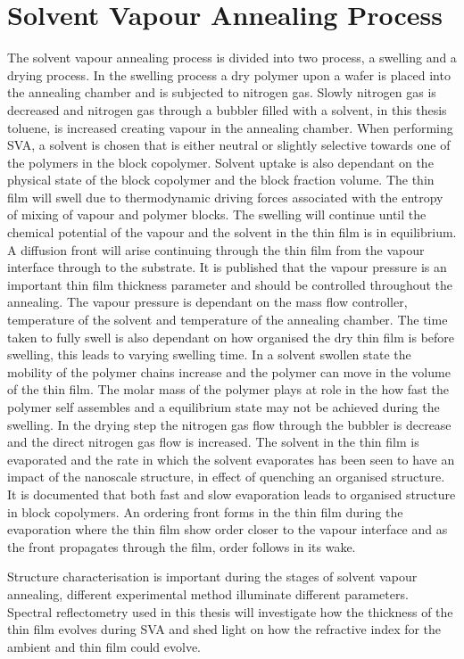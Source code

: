 \documentclass[MasterThesisMain.tex]{subfiles}
\begin{document}
\section{Solvent Vapour Annealing Process}
The solvent vapour annealing process is divided into two process, a swelling and a drying process. In the swelling process a dry polymer upon a wafer is placed into the annealing chamber and is subjected to nitrogen gas. Slowly nitrogen gas is decreased and nitrogen gas through a bubbler filled with a solvent, in this thesis toluene, is increased creating vapour in the annealing chamber. When performing SVA, a solvent is chosen that is either neutral or slightly selective towards one of the polymers in the block copolymer. Solvent uptake is also dependant on the physical state of the block copolymer and the block fraction volume. The thin film will swell due to thermodynamic driving forces associated with the entropy of mixing of vapour and polymer blocks. The swelling will continue until the chemical potential of the vapour and the solvent in the thin film is in equilibrium. A diffusion front will arise continuing through the thin film from the vapour interface through to the substrate. It is published that the vapour pressure is an important thin film thickness parameter and should be controlled throughout the annealing. The vapour pressure is dependant on the mass flow controller, temperature of the solvent and temperature of the annealing chamber. The time taken to fully swell is also dependant on how organised the dry thin film is before swelling, this leads to varying swelling time. In a solvent swollen state the mobility of the polymer chains increase and the polymer can move in the volume of the thin film. The molar mass of the polymer plays at role in the how fast the polymer self assembles and a equilibrium state may not be achieved during the swelling. In the drying step the nitrogen gas flow through the bubbler is decrease and the direct nitrogen gas flow is increased. The solvent in the thin film is evaporated and the rate in which the solvent evaporates has been seen to have an impact of the nanoscale structure, in effect of quenching an organised structure. It is documented that both fast and slow evaporation leads to organised structure in block copolymers. An ordering front forms in the thin film during the evaporation where the thin film show order closer to the vapour interface and as the front propagates through the film, order follows in its wake\cite{SVABCP}. 

Structure characterisation is important during the stages of solvent vapour annealing, different experimental method illuminate different parameters. Spectral reflectometry used in this thesis will investigate how the thickness of the thin film evolves during SVA and shed light on how the refractive index for the ambient and thin film could evolve. 

   
\end{document}
